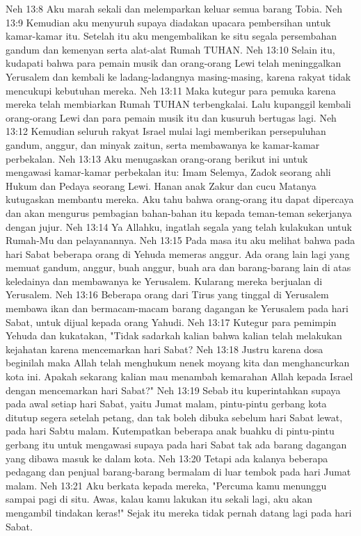 Neh 13:8  Aku marah sekali dan melemparkan keluar semua barang Tobia.
Neh 13:9  Kemudian aku menyuruh supaya diadakan upacara pembersihan untuk kamar-kamar itu. Setelah itu aku mengembalikan ke situ segala persembahan gandum dan kemenyan serta alat-alat Rumah TUHAN.
Neh 13:10  Selain itu, kudapati bahwa para pemain musik dan orang-orang Lewi telah meninggalkan Yerusalem dan kembali ke ladang-ladangnya masing-masing, karena rakyat tidak mencukupi kebutuhan mereka.
Neh 13:11  Maka kutegur para pemuka karena mereka telah membiarkan Rumah TUHAN terbengkalai. Lalu kupanggil kembali orang-orang Lewi dan para pemain musik itu dan kusuruh bertugas lagi.
Neh 13:12  Kemudian seluruh rakyat Israel mulai lagi memberikan persepuluhan gandum, anggur, dan minyak zaitun, serta membawanya ke kamar-kamar perbekalan.
Neh 13:13  Aku menugaskan orang-orang berikut ini untuk mengawasi kamar-kamar perbekalan itu: Imam Selemya, Zadok seorang ahli Hukum dan Pedaya seorang Lewi. Hanan anak Zakur dan cucu Matanya kutugaskan membantu mereka. Aku tahu bahwa orang-orang itu dapat dipercaya dan akan mengurus pembagian bahan-bahan itu kepada teman-teman sekerjanya dengan jujur.
Neh 13:14  Ya Allahku, ingatlah segala yang telah kulakukan untuk Rumah-Mu dan pelayanannya.
Neh 13:15  Pada masa itu aku melihat bahwa pada hari Sabat beberapa orang di Yehuda memeras anggur. Ada orang lain lagi yang memuat gandum, anggur, buah anggur, buah ara dan barang-barang lain di atas keledainya dan membawanya ke Yerusalem. Kularang mereka berjualan di Yerusalem.
Neh 13:16  Beberapa orang dari Tirus yang tinggal di Yerusalem membawa ikan dan bermacam-macam barang dagangan ke Yerusalem pada hari Sabat, untuk dijual kepada orang Yahudi.
Neh 13:17  Kutegur para pemimpin Yehuda dan kukatakan, "Tidak sadarkah kalian bahwa kalian telah melakukan kejahatan karena mencemarkan hari Sabat?
Neh 13:18  Justru karena dosa beginilah maka Allah telah menghukum nenek moyang kita dan menghancurkan kota ini. Apakah sekarang kalian mau menambah kemarahan Allah kepada Israel dengan mencemarkan hari Sabat?"
Neh 13:19  Sebab itu kuperintahkan supaya pada awal setiap hari Sabat, yaitu Jumat malam, pintu-pintu gerbang kota ditutup segera setelah petang, dan tak boleh dibuka sebelum hari Sabat lewat, pada hari Sabtu malam. Kutempatkan beberapa anak buahku di pintu-pintu gerbang itu untuk mengawasi supaya pada hari Sabat tak ada barang dagangan yang dibawa masuk ke dalam kota.
Neh 13:20  Tetapi ada kalanya beberapa pedagang dan penjual barang-barang bermalam di luar tembok pada hari Jumat malam.
Neh 13:21  Aku berkata kepada mereka, "Percuma kamu menunggu sampai pagi di situ. Awas, kalau kamu lakukan itu sekali lagi, aku akan mengambil tindakan keras!" Sejak itu mereka tidak pernah datang lagi pada hari Sabat.

